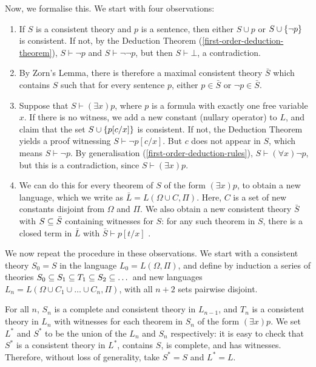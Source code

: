 \documentclass{article}
\begin{document}
\begin{prf}
    Now, we formalise this. We start with four observations:
    \begin{enumerate}
    	\item If $S$ is a consistent theory and $p$ is a sentence, then either $S \cup p$ or $S \cup \left\lbrace \lnot p \right\rbrace$ is consistent. If not, by the Deduction Theorem (\ref{first-order-deduction-theorem}), $S \vdash \lnot p$ and $S \vdash \lnot \lnot p$, but then $S \vdash \bot$, a contradiction.
    	\item By Zorn's Lemma, there is therefore a maximal consistent theory $\bar S$ which contains $S$ such that for every sentence $p$, either $p \in \bar S$ or $\lnot p \in \bar S$.
    	\item Suppose that $S \vdash (\exists x) p$, where $p$ is a formula with exactly one free variable $x$. If there is no witness, we add a new constant (nullary operator) to $L$, and claim that the set $S \cup \left\lbrace p[c/x] \right\rbrace$ is consistent. If not, the Deduction Theorem yields a proof witnessing $S \vdash \lnot p[c/x]$. But $c$ does not appear in $S$, which means $S \vdash \lnot p$. By generalisation (\ref{first-order-deduction-rules}), $S \vdash (\forall x) \lnot p$, but this is a contradiction, since $S \vdash (\exists x) p$.
    	\item We can do this for every theorem of $S$ of the form $(\exists x) p$, to obtain a new language, which we write as $\bar L = L(\Omega \cup C, \Pi)$. Here, $C$ is a set of new constants disjoint from $\Omega$ and $\Pi$. We also obtain a new consistent theory $\bar S$ with $S \subseteq \bar S$ containing witnesses for $S$: for any such theorem in $S$, there is a closed term in $\bar L$ with $\bar S \vdash p[t/x]$ .
	\end{enumerate}
	We now repeat the procedure in these observations. We start with a consistent theory $S_0 = S$ in the language $L_0 = L(\Omega, \Pi)$, and define by induction a series of theories $S_0 \subseteq S_1 \subseteq T_1 \subseteq S_2 \subseteq \dots $ and new languages $L_n = L(\Omega \cup C_1 \cup \dots \cup C_n, \Pi)$, with all $n+2$ sets pairwise disjoint.
	
	For all $n$, $S_n$ is a complete and consistent theory in $L_{n-1}$, and $T_n$ is a consistent theory in $L_n$ with witnesses for each theorem in $S_n$ of the form $(\exists x)p$. We set $L^*$ and $S^*$ to be the union of the $L_n$ and $S_n$ respectively: it is easy to check that $S^*$ is a consistent theory in $L^*$, contains $S$, is complete, and has witnesses. Therefore, without loss of generality, take $S^* = S$ and $L^* = L$.
	

\end{prf}
\end{document}
